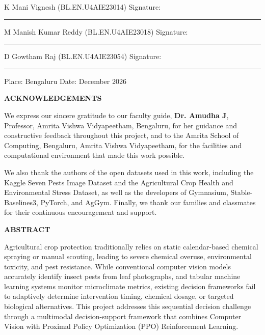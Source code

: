 \documentclass[12pt,a4paper]{report}
\begin{document}
\vspace{1.5cm}
\noindent K Mani Vignesh (BL.EN.U4AIE23014) \hfill Signature: \rule{4.5cm}{0.4pt}\par
\vspace{0.8cm}
\noindent M Manish Kumar Reddy (BL.EN.U4AIE23018) \hfill Signature: \rule{4.5cm}{0.4pt}\par
\vspace{0.8cm}
\noindent D Gowtham Raj (BL.EN.U4AIE23054) \hfill Signature: \rule{4.5cm}{0.4pt}\par
\vspace{1.5cm}
\noindent Place: Bengaluru \hfill Date: December 2026

\newpage
\begin{center}
{\Large\bfseries ACKNOWLEDGEMENTS\par}
\end{center}
\vspace{1cm}
We express our sincere gratitude to our faculty guide, \textbf{Dr. Amudha J}, Professor, Amrita Vishwa Vidyapeetham, Bengaluru, for her guidance and constructive feedback throughout this project, and to the Amrita School of Computing, Bengaluru, Amrita Vishwa Vidyapeetham, for the facilities and computational environment that made this work possible.

We also thank the authors of the open datasets used in this work, including the Kaggle Seven Pests Image Dataset and the Agricultural Crop Health and Environmental Stress Dataset, as well as the developers of Gymnasium, Stable-Baselines3, PyTorch, and AgGym. Finally, we thank our families and classmates for their continuous encouragement and support.

\newpage
\begin{center}
{\Large\bfseries ABSTRACT\par}
\end{center}
\vspace{0.8cm}
Agricultural crop protection traditionally relies on static calendar-based chemical spraying or manual scouting, leading to severe chemical overuse, environmental toxicity, and pest resistance. While conventional computer vision models accurately identify insect pests from leaf photographs, and tabular machine learning systems monitor microclimate metrics, existing decision frameworks fail to adaptively determine intervention timing, chemical dosage, or targeted biological alternatives. This project addresses this sequential decision challenge through a multimodal decision-support framework that combines Computer Vision with Proximal Policy Optimization (PPO) Reinforcement Learning.
\end{document}
